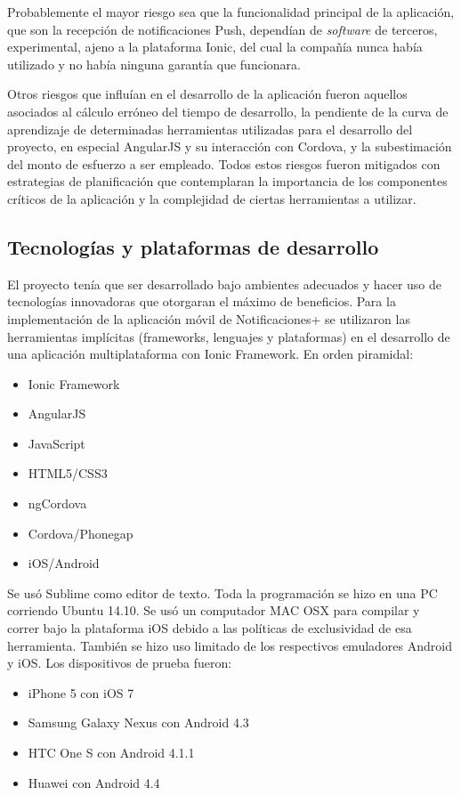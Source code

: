 Probablemente el mayor riesgo sea que la funcionalidad principal de la aplicación, que son la recepción de notificaciones Push, dependían de \textit{software} de terceros, experimental, ajeno a la plataforma Ionic, del cual la compañía nunca había utilizado y no había ninguna garantía que funcionara. 


Otros riesgos que influían en el desarrollo de la aplicación fueron aquellos asociados al cálculo erróneo del tiempo de desarrollo, la pendiente de la curva de aprendizaje de determinadas herramientas utilizadas para el desarrollo del proyecto, en especial AngularJS y su interacción con Cordova, y la subestimación del monto de esfuerzo a ser empleado. Todos estos riesgos fueron mitigados con estrategias de planificación que contemplaran la importancia de los componentes críticos de la aplicación y la complejidad de ciertas herramientas a utilizar.


\subsection{Tecnologías y plataformas de desarrollo}
El proyecto tenía que ser desarrollado bajo ambientes adecuados y hacer uso de tecnologías innovadoras que otorgaran el máximo de beneficios. Para la implementación de la aplicación móvil de Notificaciones+ se utilizaron las herramientas implícitas (frameworks, lenguajes y plataformas) en el desarrollo de una aplicación multiplataforma con Ionic Framework. En orden piramidal: 
\smallskip
\begin{itemize}[noitemsep,nolistsep]
  \item Ionic Framework
  \item AngularJS
  \item JavaScript
  \item HTML5/CSS3
  \item ngCordova
  \item Cordova/Phonegap
  \item iOS/Android
\end{itemize}
\bigskip

Se usó Sublime como editor de texto. Toda la programación se hizo en una PC corriendo Ubuntu 14.10. Se usó un computador MAC OSX para compilar y correr bajo la plataforma iOS debido a las políticas de exclusividad de esa herramienta. También se hizo uso limitado de los respectivos emuladores Android y iOS. Los dispositivos de prueba fueron:
\smallskip
\begin{itemize}[noitemsep,nolistsep]
  \item iPhone 5 con iOS 7
  \item Samsung Galaxy Nexus con Android 4.3 
  \item HTC One S con Android 4.1.1
  \item Huawei con Android 4.4
\end{itemize}
\bigskip 


